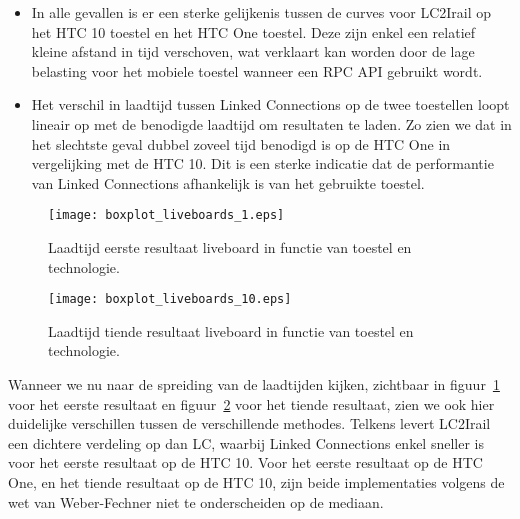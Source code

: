 \begin{itemize}
	\item In alle gevallen is er een sterke gelijkenis tussen de curves voor LC2Irail op het HTC 10 toestel en het HTC One toestel. Deze zijn enkel een relatief kleine afstand in tijd verschoven, wat verklaart kan worden door de lage belasting voor het mobiele toestel wanneer een RPC API gebruikt wordt.

	\item Het verschil in laadtijd tussen Linked Connections op de twee toestellen loopt lineair op met de benodigde laadtijd om resultaten te laden. Zo zien we dat in het slechtste geval dubbel zoveel tijd benodigd is op de HTC One in vergelijking met de HTC 10. Dit is een sterke indicatie dat de performantie van Linked Connections afhankelijk is van het gebruikte toestel.
\end{itemize}

\begin{figure}[h]
	\centering
	\texttt{[image: boxplot\_liveboards\_1.eps]}
	\caption[Laadtijd eerste resultaat liveboard in functie van toestel en technologie]{Laadtijd eerste resultaat liveboard in functie van toestel en technologie.}
	\label{fig:liveboardsBoxplot1}
\end{figure}

\begin{figure}[h]
	\centering
	\texttt{[image: boxplot\_liveboards\_10.eps]}
	\caption[Laadtijd tiende resultaat liveboard in functie van toestel en technologie]{Laadtijd tiende resultaat liveboard in functie van toestel en technologie.}
	\label{fig:liveboardsBoxplot10}
\end{figure}

Wanneer we nu naar de spreiding van de laadtijden kijken, zichtbaar in figuur~\ref{fig:liveboardsBoxplot1} voor het eerste resultaat en figuur~\ref{fig:liveboardsBoxplot10} voor het tiende resultaat, zien we ook hier duidelijke verschillen tussen de verschillende methodes. Telkens levert LC2Irail een dichtere verdeling op dan LC, waarbij Linked Connections enkel sneller is voor het eerste resultaat op de HTC 10. Voor het eerste resultaat op de HTC One, en het tiende resultaat op de HTC 10, zijn beide implementaties volgens de wet van Weber-Fechner niet te onderscheiden op de mediaan.

